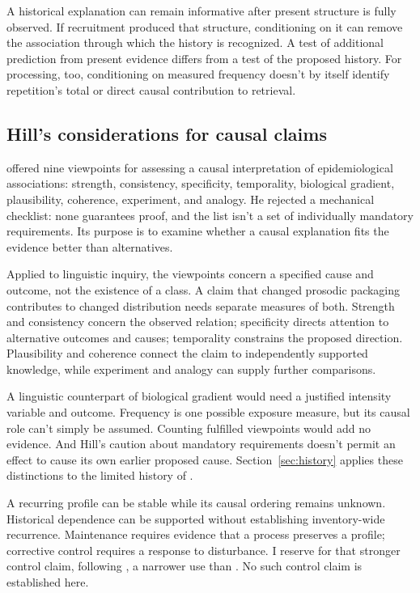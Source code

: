 \documentclass[12pt]{article}
\begin{document}
A historical explanation can remain informative after present structure
is fully observed. If recruitment produced that structure, conditioning
on it can remove the association through which the history is recognized.
A test of additional prediction from present evidence differs
from a test of the proposed history. For processing, too, conditioning
on measured frequency doesn't by itself identify repetition's total or
direct causal contribution to retrieval.

\subsection{Hill's considerations for causal claims}\label{sec:hill}

\textcite[295--299]{hill1965} offered nine viewpoints for assessing a
causal interpretation of epidemiological associations: strength,
consistency, specificity, temporality, biological gradient, plausibility,
coherence, experiment, and analogy. He rejected a mechanical checklist:
none guarantees proof, and the list isn't a set of individually mandatory
requirements. Its purpose is to examine whether a causal explanation
fits the evidence better than alternatives.

Applied to linguistic inquiry, the viewpoints concern a specified
cause and outcome, not the existence of a class. A claim that changed
prosodic packaging contributes to changed distribution needs separate
measures of both. Strength and consistency concern the observed relation;
specificity directs attention to alternative outcomes and causes;
temporality constrains the proposed direction. Plausibility and coherence
connect the claim to independently supported knowledge, while experiment
and analogy can supply further comparisons.

A linguistic counterpart of biological gradient would need a justified
intensity variable and outcome. Frequency is one possible exposure
measure, but its causal role can't simply be assumed. Counting fulfilled
viewpoints would add no evidence. And Hill's caution about mandatory
requirements doesn't permit an effect to cause its own earlier proposed
cause. Section~\ref{sec:history} applies these distinctions to the
limited history of .

A recurring profile can be stable while its causal ordering remains
unknown. Historical dependence can be supported without establishing
inventory-wide recurrence. Maintenance requires evidence that a process
preserves a profile; corrective control requires a response to disturbance.
I reserve  for that stronger control claim, following
\textcite{reynolds2026notEveryStableCluster}, a narrower use than
\textcite[143]{boyd1999}. No such control claim is established here.
\end{document}
